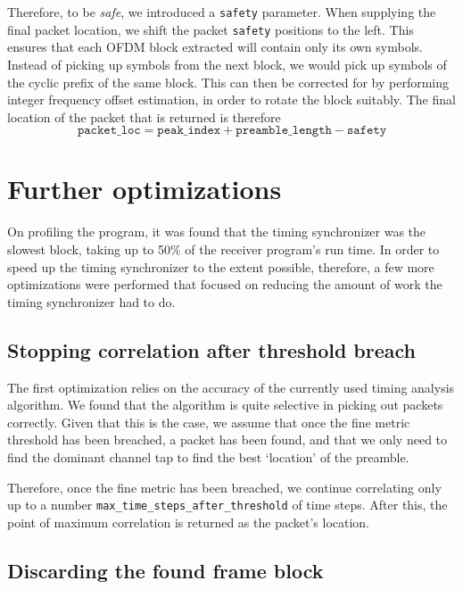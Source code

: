Therefore, to be \emph{safe}, we introduced a \verb+safety+ parameter. When
supplying the final packet location, we shift the packet \verb+safety+
positions to the left. This ensures that each OFDM block extracted will contain
only its own symbols. Instead of picking up symbols from the next block, we
would pick up symbols of the cyclic prefix of the same block. This can then be
corrected for by performing integer frequency offset estimation, in order to
rotate the block suitably. The final location of the packet that is returned is
therefore $$\texttt{packet\_loc} = \texttt{peak\_index} +
\texttt{preamble\_length} - \texttt{safety}$$


\section{Further optimizations}

On profiling the program, it was found that the timing synchronizer was the
slowest block, taking up to 50\% of the receiver program's run time. In order
to speed up the timing synchronizer to the extent possible, therefore, a few
more optimizations were performed that focused on reducing the amount of work
the timing synchronizer had to do.

\subsection{Stopping correlation after threshold breach}

The first optimization relies on the accuracy of the currently used timing
analysis algorithm. We found that the algorithm is quite selective in picking
out packets correctly. Given that this is the case, we assume that once the
fine metric threshold has been breached, a packet has been found, and that we
only need to find the dominant channel tap to find the best `location' of the
preamble.

Therefore, once the fine metric has been breached, we continue correlating only
up to a number \verb+max_time_steps_after_threshold+ of time steps. After this,
the point of maximum correlation is returned as the packet's location.

\subsection{Discarding the found frame block}

